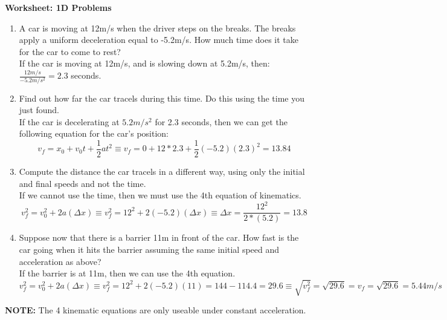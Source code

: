 \documentclass[]{article}
\date{}
\title{\docTitle}
\author{\docAuthor}
\date{\today}
\begin{document}
\maketitle

\textbf{Worksheet: 1D Problems}

\begin{enumerate}
	\item A car is moving at 12m/s when the driver steps on the breaks. The breaks apply a uniform deceleration equal to -5.2m/s. How much time does it take for the car to come to rest?\\
	If the car is moving at 12m/s, and is slowing down at 5.2m/s, then:\\
		$\frac{12m/s}{-5.2m/s^2} = 2.3$ seconds.\\
	\item Find out how far the car tracels during this time. Do this using the time you just found.\\
		If the car is decelerating at $5.2m/s^2$ for 2.3 seconds, then we can get the following equation for the car's position:\\
		$$v_f=x_0+v_0t+\frac{1}{2}at^2 \equiv v_f=0+12*2.3 + \frac{1}{2}(-5.2)(2.3)^2 = 13.84$$
	\item Compute the distance the car tracels in a different way, using only the initial and final speeds and not the time.\\
		If we cannot use the time, then we must use the 4th equation of kinematics.\\
		$$v_f^2=v_0^2+2a(\Delta x) \equiv v_f^2 = 12^2 + 2(-5.2)(\Delta x) \equiv \Delta x = \frac{12^2}{2*(5.2)} = 13.8$$
	\item Suppose now that there is a barrier 11m in front of the car. How fast is the car going when it hits the barrier assuming the same initial speed and acceleration as above?\\
		If the barrier is at 11m, then we can use the 4th equation.\\
		$$v_f^2=v_0^2+2a(\Delta x) \equiv v_f^2 = 12^2+2(-5.2)(11) = 144-114.4 = 29.6 \equiv \sqrt{v_f^2} = \sqrt{29.6} = v_f = \sqrt{29.6} = 5.44m/s$$
\end{enumerate}

\textbf{NOTE:} The 4 kinematic equations are only useable under constant acceleration.
\end{document}
